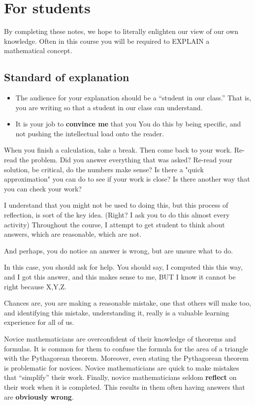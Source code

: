 \documentclass[handout,nooutcomes,noauthor]{ximera}
\begin{document}
\section*{For students}




By completing these notes, we hope to literally enlighten our view of
our own knowledge.  Often in this course you will be required to
EXPLAIN a mathematical concept.

\subsection*{Standard of explanation}
\begin{itemize}
  \item The audience for your explanation should be a ``student in our
    class.'' That is, you are writing so that a student in our class
    can understand. 
  \item It is your job to \textbf{convince me} that you  You do this by being specific, and not pushing the
    intellectual load onto the reader.
\end{itemize}


When you finish a calculation, take a break. Then come back to your
work.  Re-read the problem. Did you answer everything that was asked?
Re-read your solution, be critical, do the numbers make sense? Is
there a "quick approximation" you can do to see if your work is close?
Is there another way that you can check your work?

I understand that you might not be used to doing this, but this
process of reflection, is sort of the key idea. (Right? I ask you to
do this almost every activity) Throughout the course, I attempt to get
student to think about answers, which are reasonable, which are not.

And perhaps, you do notice an answer is wrong, but are unsure what to
do.

In this case, you should ask for help. You should say, I computed this
this way, and I got this answer, and this makes sense to me, BUT I
know it cannot be right because X,Y,Z.

Chances are, you are making a reasonable mistake, one that others will
make too, and identifying this mistake, understanding it, really is a
valuable learning experience for all of us.




Novice mathematicians are overconfident of their knowledge of theorems
and formulas. It is common for them to confuse the formula for the
area of a triangle with the Pythagorean theorem. Moreover, even
stating the Pythagorean theorem is problematic for novices. Novice
mathematicians are quick to make mistakes that ``simplify'' their
work. Finally, novice mathematicians seldom \textbf{reflect} on their
work when it is completed. This results in them often having answers
that are \textbf{obviously wrong}.
\end{document}
